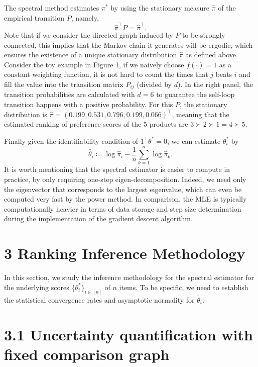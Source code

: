 The spectral method estimates \(\pi^{*}\) by using the stationary measure \(\widehat{\pi}\) of the empirical transition \(P\), namely,
\[
\widehat{\pi}^{\top}P = \widehat{\pi}^{\top}.
\]
Note that if we consider the directed graph induced by \(P\) to be strongly connected, this implies that the Markov chain it generates will be ergodic, which ensures the existence of a unique stationary distribution \(\widehat{\pi}\) as defined above. Consider the toy example in Figure 1, if we naively choose \(f(\cdot) = 1\) as a constant weighting function, it is not hard to count the times that \(j\) beats \(i\) and fill the value into the transition matrix \(P_{i j}\) (divided by \(d\)). In the right panel, the transition probabilities are calculated with \(d = 6\) to guarantee the self-loop transition happens with a positive probability. For this \(P\), the stationary distribution is \(\widehat{\pi} = (0.199,0.531,0.796,0.199,0.066)^{\top}\), meaning that the estimated ranking of preference scores of the 5 products are \(3\succ 2\succ 1 = 4\succ 5\).

Finally given the identifiability condition of \(1^{\top}\theta^{*} = 0\), we can estimate \(\theta_{i}^{*}\) by
\[
\widehat{\theta}_{i}\coloneqq \log \widehat{\pi}_{i} - \frac{1}{n}\sum_{k = 1}^{n}\log \widehat{\pi}_{k}. \tag{2.1}
\]
It is worth mentioning that the spectral estimator is easier to compute in practice, by only requiring one-step eigen-decomposition. Indeed, we need only the eigenvector that corresponds to the largest eigenvalue, which can even be computed very fast by the power method. In comparison, the MLE is typically computationally heavier in terms of data storage and step size determination during the implementation of the gradient descent algorithm.

\section{3 Ranking Inference Methodology}\label{ranking-inference-methodology}

In this section, we study the inference methodology for the spectral estimator for the underlying scores \(\{\theta_{i}^{*}\}_{i\in [n]}\) of \(n\) items. To be specific, we need to establish the statistical convergence rates and asymptotic normality for \(\widetilde{\theta_{i}}\).

\section{3.1 Uncertainty quantification with fixed comparison graph}\label{uncertainty-quantification-with-fixed-comparison-graph}

